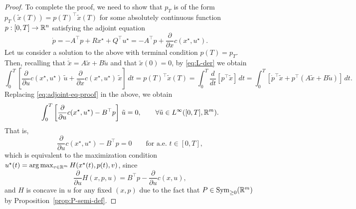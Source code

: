 \begin{proof}
    To complete the proof, we need to show that $p_T$ is of the form $p_T(\tilde x(T)) = p(T)^\top \tilde x(T)$ for some absolutely continuous function $p:[0,T]\to \mathbb{R}^n$ satisfying the adjoint equation 
    \begin{equation}
        \label{eq:adjoint-eq-proof}
        \dot p =-A^\top p + Rx^\star + Q^\top u^\star =  -A^\top p + \frac{\partial}{\partial x}c(x^\star, u^\star).
    \end{equation}
    Let us consider a solution to the above with terminal condition $p(T)=p_T$.
    Then, recalling that $\dot{\tilde x} = A\tilde x + B \tilde u$ and that $\tilde x(0)=0$, by \eqref{eq:L-der} we obtain
     \begin{equation}
        \int_0^T \left[ \frac{\partial}{\partial u} c(x^\star, u^\star) \, \tilde u + \frac{\partial}{\partial x}c(x^\star, u^\star) \, \tilde x  \right] \, dt
        = p(T)^\top \tilde x(T)
        = \int_0^T \frac{d}{dt} \left[p^\top \tilde x\right]\, dt
        = \int_0^T \left[ \dot p^\top \tilde x + p^\top (A\tilde x + B\tilde u) \right]\, dt.
     \end{equation}
    Replacing \eqref{eq:adjoint-eq-proof} in the above, we obtain 
    \begin{equation}
        \int_0^T \left[\frac{\partial}{\partial u} c(x^\star, u^\star) - B^\top p \right]\, \tilde u = 0, \qquad \forall \tilde u\in L^\infty([0,T],\mathbb{R}^m). 
    \end{equation} 
    That is, 
    \begin{equation}
       \frac{\partial}{\partial u} c(x^\star, u^\star) - B^\top p = 0 \qquad \text{for a.e.\ } t\in [0,T],  
    \end{equation}
    which is equivalent to the maximization condition $u^\star(t) = \arg\max_{v\in \mathbb{R}^m} H(x^\star(t),p(t),v)$, since
    \begin{equation}
        \frac{\partial}{\partial u} H(x,p,u) = B^\top p - \frac{\partial}{\partial u} c(x,u),
    \end{equation}
    and $H$ is concave in $u$ for any fixed $(x,p)$ due to the fact that $P\in \operatorname{Sym}_{\ge0}(\mathbb{R}^m)$ by Proposition~\ref{prop:P-semi-def}.
\end{proof}


